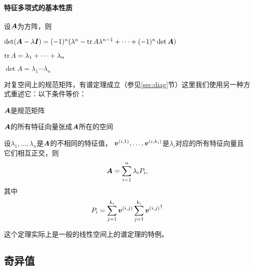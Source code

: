 \documentclass[UTF8]{ctexart}
\theoremstyle{definition}
\renewenvironment{itemize}{\begin{compactitem}}{\end{compactitem}}
\begin{document}
\paragraph{特征多项式的基本性质}
设$\vb*{A}$为方阵，则
\begin{itemize}
    \item $\det (\vb*{A} - \lambda \vb*{I}) = (-1)^n (\lambda^n - \tr A \lambda^{n-1} + \cdots + (-1)^n \det \vb*{A})$
    \item $\tr A = \lambda_1 + \cdots + \lambda_n$
    \item $\det A = \lambda_1 \cdots \lambda_n$
\end{itemize}

对复空间上的规范矩阵，有谱定理成立（参见\ref{sec:diag}节）这里我们使用另一种方式重述它：以下条件等价：
\begin{itemize}
    \item $\vb*{A}$是规范矩阵
    \item $\vb*{A}$的所有特征向量张成$\vb*{A}$所在的空间
    \item 设$\lambda_1, \ldots, \lambda_n$是$\vb*{A}$的不相同的特征值，
    $\vb*{v}^{(i, 1)}, \ldots, \vb*{v}^{(i, k_i)}$是$\lambda_i$对应的所有特征向量且它们相互正交，则
    \[
        \vb*{A} = \sum_{i=1}^n \lambda_i P_i,
    \]
    其中
    \[
        P_i = \sum_{j=1}^{k_i} \vb*{v}^{(i, j)} \sum_{j=1}^{k_i} {\vb*{v}^{(i, j)}}^\dagger
    \]
\end{itemize}
这个定理实际上是一般的线性空间上的谱定理的特例。

\subsection{奇异值}
\end{document}
